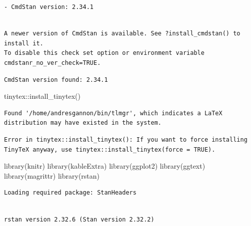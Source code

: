 \documentclass[
  12,
  letterpaper,
  DIV=11,
  numbers=noendperiod]{scrartcl}
\newenvironment{Shaded}{\begin{snugshade}}{\end{snugshade}}
\newcommand{\FunctionTok}[1]{\textcolor[rgb]{0.28,0.35,0.67}{#1}}
\newcommand{\NormalTok}[1]{\textcolor[rgb]{0.00,0.23,0.31}{#1}}
\newcommand{\SpecialCharTok}[1]{\textcolor[rgb]{0.37,0.37,0.37}{#1}}
\begin{document}
\begin{verbatim}
- CmdStan version: 2.34.1
\end{verbatim}

\begin{verbatim}

A newer version of CmdStan is available. See ?install_cmdstan() to install it.
To disable this check set option or environment variable cmdstanr_no_ver_check=TRUE.
\end{verbatim}

\begin{verbatim}
CmdStan version found: 2.34.1
\end{verbatim}

\begin{Shaded}
\begin{Highlighting}[numbers=left,,]
\NormalTok{tinytex}\SpecialCharTok{::}\FunctionTok{install\_tinytex}\NormalTok{()}
\end{Highlighting}
\end{Shaded}

\begin{verbatim}
Found '/home/andresgannon/bin/tlmgr', which indicates a LaTeX distribution may have existed in the system.
\end{verbatim}

\begin{verbatim}
Error in tinytex::install_tinytex(): If you want to force installing TinyTeX anyway, use tinytex::install_tinytex(force = TRUE).
\end{verbatim}

\begin{Shaded}
\begin{Highlighting}[numbers=left,,]
\FunctionTok{library}\NormalTok{(knitr)}
\FunctionTok{library}\NormalTok{(kableExtra)}
\FunctionTok{library}\NormalTok{(ggplot2)}
\FunctionTok{library}\NormalTok{(ggtext)}
\FunctionTok{library}\NormalTok{(magrittr)}
\FunctionTok{library}\NormalTok{(rstan)}
\end{Highlighting}
\end{Shaded}

\begin{verbatim}
Loading required package: StanHeaders
\end{verbatim}

\begin{verbatim}

rstan version 2.32.6 (Stan version 2.32.2)
\end{verbatim}
\end{document}
